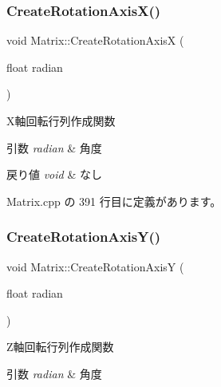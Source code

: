 \mbox{\label{class_matrix_abac995d9979d7f308e824cdfc17ce5df}} 
\subsubsection{\texorpdfstring{Create\+Rotation\+Axis\+X()}{CreateRotationAxisX()}}
{\footnotesize\ttfamily void Matrix\+::\+Create\+Rotation\+AxisX (\begin{DoxyParamCaption}\item[{float}]{radian }\end{DoxyParamCaption})}



X軸回転行列作成関数 


\begin{DoxyParams}{引数}
{\em radian} & 角度 \\
\hline
\end{DoxyParams}

\begin{DoxyRetVals}{戻り値}
{\em void} & なし \\
\hline
\end{DoxyRetVals}


 Matrix.\+cpp の 391 行目に定義があります。

\mbox{\label{class_matrix_a3ccd2f99d93caa2bbabd34f6db9ab309}} 
\subsubsection{\texorpdfstring{Create\+Rotation\+Axis\+Y()}{CreateRotationAxisY()}}
{\footnotesize\ttfamily void Matrix\+::\+Create\+Rotation\+AxisY (\begin{DoxyParamCaption}\item[{float}]{radian }\end{DoxyParamCaption})}



Z軸回転行列作成関数 


\begin{DoxyParams}{引数}
{\em radian} & 角度 \\
\hline
\end{DoxyParams}

